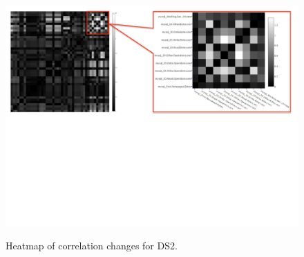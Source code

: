 \begin{figure}[tbh]
	\centering
	{\includegraphics[width=.9\textwidth]{figures/heat}}
	\caption{Heatmap of correlation changes for DS2.}
	\label{fig:heatmap}
\end{figure}





%			


